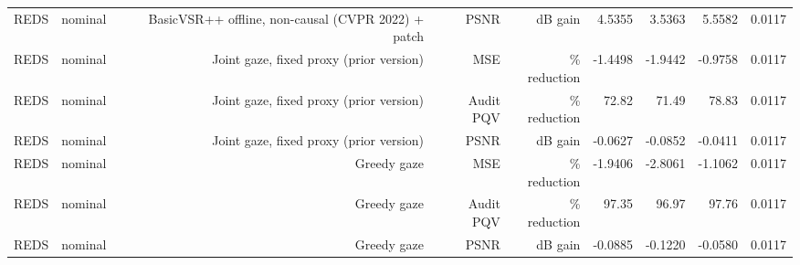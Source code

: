 \begin{table}[t]
\begin{tabular}{llrrrrrrr}
REDS & nominal & BasicVSR++ offline, non-causal (CVPR 2022) + patch & PSNR & dB gain & 4.5355 & 3.5363 & 5.5582 & 0.0117 \\
REDS & nominal & Joint gaze, fixed proxy (prior version) & MSE & \% reduction & -1.4498 & -1.9442 & -0.9758 & 0.0117 \\
REDS & nominal & Joint gaze, fixed proxy (prior version) & Audit PQV & \% reduction & 72.82 & 71.49 & 78.83 & 0.0117 \\
REDS & nominal & Joint gaze, fixed proxy (prior version) & PSNR & dB gain & -0.0627 & -0.0852 & -0.0411 & 0.0117 \\
REDS & nominal & Greedy gaze & MSE & \% reduction & -1.9406 & -2.8061 & -1.1062 & 0.0117 \\
REDS & nominal & Greedy gaze & Audit PQV & \% reduction & 97.35 & 96.97 & 97.76 & 0.0117 \\
REDS & nominal & Greedy gaze & PSNR & dB gain & -0.0885 & -0.1220 & -0.0580 & 0.0117 \\
\bottomrule
\end{tabular}
\end{table}
